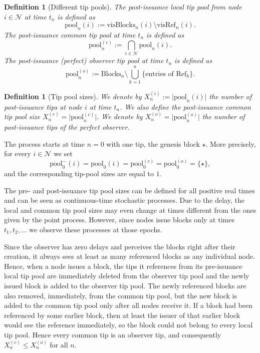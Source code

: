 \documentclass[a4paper,12pt,oneside,reqno]{amsart}
\newcommand{\Nodes}{{\mathcal N}}
\newcommand{\blocks}{\mathrm{Blocks}}
\newcommand{\visibleBlocks}{\mathrm{visBlocks}}
\newcommand{\visibleRef}{\mathrm{visRef}}
\newcommand{\1}{{\mathbf 1}}
\newcommand{\pool}{\mathrm{pool}}
\newcommand{\refBlock}{\mathrm{Ref}}
\newtheorem{defi}[theo]{Definition}
\begin{document}
\begin{defi}[Different tip pools]
The \emph{post-issuance local tip pool} from node $i\in \Nodes$ at time $t_n$ is defined as
\begin{equation}
    \pool_n(i):=\visibleBlocks_n(i) \setminus \visibleRef_n(i).
\end{equation}
The \emph{post-issuance common tip pool} at time $t_n$ is defined as
\begin{equation}
    \pool_n^{(c)} := \bigcap_{i\in \Nodes} \pool_n(i).
\end{equation}
The \emph{post-issuance (perfect) observer tip pool} at time $t_n$ is defined as
\begin{equation}
    \pool_n^{(o)} := \blocks_n \setminus \bigcup_{k=1}^{n}\{\text{entries of }\refBlock_k\}.
\end{equation}
\end{defi}

\begin{defi}[Tip pool sizes]
We denote by $X_n^{(i)}:= \lvert \pool_n(i) \rvert$ the number of post-issuance tips at node $i$ at time $t_n$. We also define the post-issuance common tip pool size $X_n^{(c)}= \lvert\pool_n^{(c)}\rvert$.
We denote by $X_n^{(o)}= \lvert \pool_n^{(o)}\rvert $ the number of post-issuance tips of the perfect observer.
\end{defi}

The process starts at time $n=0$ with one tip, the genesis block $\star$. More precisely, for every $i\in\Nodes$ we set 
\begin{equation}
    \pool_{0}^{-}(i)=\pool_{0}(i)=\pool_{0}^{(c)}=\pool_{0}^{(o)}=\{\star\},
\end{equation}
and the corresponding tip-pool sizes are equal to $1$.

The pre- and post-issuance tip pool sizes can be defined for all positive real times and can be seen as continuous-time stochastic processes. Due to the delay, the local and common tip pool sizes may even change at times different from the ones given by the point process. However, since nodes issue blocks only at times $t_1,t_2,\ldots$ we observe these processes at those epochs.

Since the observer has zero delays and perceives the blocks right after their creation, it always sees at least as many referenced blocks as any individual node. Hence, when a node issues a block, the tips it references from its pre-issuance local tip pool are immediately deleted from the observer tip pool and the newly issued block is added to the observer tip pool. The newly referenced blocks are also removed, immediately, from the common tip pool, but the new block is added to the common tip pool only after all nodes receive it. If a block had been referenced by some earlier block, then at least the issuer of that earlier block would see the reference immediately, so the block could not belong to every local tip pool. Hence every common tip is an observer tip, and consequently $X_n^{(c)}\leq X_n^{(o)}$ for all $n$.
\end{document}
